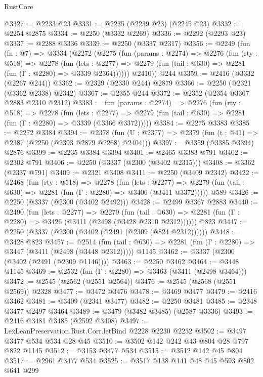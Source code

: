 \begin{lexlean}{RustCore}
\begin{coremodule}
@3327 := @2233 @23
@3331 := @2235 (@2239 @23) (@2245 @23)
@3332 := @2254 @2875
@3334 := @2250 (@3332 @2269)
@3336 := @2292 (@2293 @23)
@3337 := @2288 @3336
@3339 := @2250 (@3337 @2317)
@3356 := @2249
    (fun (fn : @7) =>
    @3334
      (@2272
        (@2275
          (fun (params : @2274) =>
          @2276
            (fun (rty : @518) =>
            @2278
              (fun (lets : @2277) =>
              @2279 (fun (tail : @630) => @2281 (fun (Γ : @2280) => @3339 @2364))))))
        @2410))
    @244
@3359 := @2416 (@3332 (@2267 @244))
@3362 := @2329 (@2330 @244) @2879
@3366 := @2250 (@2321 (@3362 @2338) @2342)
@3367 := @2355 @244
@3372 := @2352 (@2354 @3367 @2883 @2310 @2312)
@3383 := fun (params : @2274) =>
  @2276
    (fun (rty : @518) =>
    @2278
      (fun (lets : @2277) =>
      @2279 (fun (tail : @630) => @2281 (fun (Γ : @2280) => @3339 (@3366 @3372)))))
@3384 := @2275 @3383
@3385 := @2272 @3384
@3394 := @2378 (fun (U : @2377) => @2379 (fun (t : @41) => @2387 (@2250 (@2393 @2879 @2268) @2404)))
@3397 := @3359 (@3385 @3394) @2876
@3399 := @2235 @3384 @3394
@3401 := @2465 @3383 @791
@3402 := @2302 @791
@3406 := @2250 (@3337 (@2300 (@3402 @2315)))
@3408 := @3362 (@2337 @791)
@3409 := @2321 @3408
@3411 := @2250 (@3409 @2342)
@3422 := @2468
    (fun (rty : @518) =>
    @2278
      (fun (lets : @2277) =>
      @2279 (fun (tail : @630) => @2281 (fun (Γ : @2280) => @3406 (@3411 @3372)))))
    @589
@3426 := @2250 (@3337 (@2300 (@3402 @2492)))
@3428 := @2499 @3367 @2883
@3440 := @2490
    (fun (lets : @2277) =>
    @2279
      (fun (tail : @630) => @2281 (fun (Γ : @2280) => @3426 (@3411 (@2498 (@3428 @2310 @2312))))))
    @823
@3447 := @2250 (@3337 (@2300 (@3402 (@2491 (@2309 (@824 @2312))))))
@3448 := @3428 @823
@3457 := @2514
    (fun (tail : @630) => @2281 (fun (Γ : @2280) => @3447 (@3411 (@2498 (@3448 @2312)))))
    @1145
@3462 := @3337 (@2300 (@3402 (@2491 (@2309 @1146))))
@3463 := @2250 @3462
@3464 := @3448 @1145
@3469 := @2532 (fun (Γ : @2280) => @3463 (@3411 (@2498 @3464)))
@3472 := @2545 (@2562 (@2551 @2564))
@3476 := @2545 (@2568 (@2551 @2569)) @2328
@3477 := @3472 @3476
@3478 := @3469 @3477
@3479 := @2416 @3462
@3481 := @3409 (@2341 @3477)
@3482 := @2250 @3481
@3485 := @2348 @3477 @2497 @3464
@3489 := @3479 (@3482 @3485) (@2587 @3336)
@3493 := @2416 @3481 @3485 (@2592 @3408)
@3497 := LexLeanPreservation.Rust.Corr.letBind @2228 @2230 @2232
@3502 := @3497 @3477 @534 @534 @28 @45
@3510 := @3502 @142 @242 @43 @804 @28 @797 @822 @1145
@3512 := @3153 @3477 @534
@3515 := @3512 @142 @45 @804
@3517 := @2961 @3477 @534
@3525 := @3517 @138 @141 @48 @45 @593 @802 @641 @299

\end{coremodule}
\end{lexlean}
